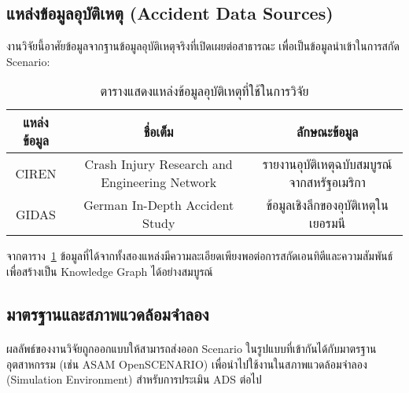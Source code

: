 \subsection{แหล่งข้อมูลอุบัติเหตุ (Accident Data Sources)}
งานวิจัยนี้อาศัยข้อมูลจากฐานข้อมูลอุบัติเหตุจริงที่เปิดเผยต่อสาธารณะ เพื่อเป็นข้อมูลนำเข้าในการสกัด Scenario:
\begin{table}[h!]
 \centering
 \caption{ตารางแสดงแหล่งข้อมูลอุบัติเหตุที่ใช้ในการวิจัย}
 \label{tab:data-sources}
 \begin{tabular}{|c|c|c|}
 \hline
 แหล่งข้อมูล & ชื่อเต็ม & ลักษณะข้อมูล \\
 \hline
 CIREN \cite{nhtsa_ciren} & Crash Injury Research and Engineering Network & รายงานอุบัติเหตุฉบับสมบูรณ์จากสหรัฐอเมริกา \\
\hline
GIDAS \cite{gidas_study} & German In-Depth Accident Study & ข้อมูลเชิงลึกของอุบัติเหตุในเยอรมนี \\
 \hline
 \end{tabular}
\end{table}

จากตาราง~\ref{tab:data-sources} ข้อมูลที่ได้จากทั้งสองแหล่งมีความละเอียดเพียงพอต่อการสกัดเอนทิตีและความสัมพันธ์เพื่อสร้างเป็น Knowledge Graph ได้อย่างสมบูรณ์

\subsection{มาตรฐานและสภาพแวดล้อมจำลอง}\label{subsec:ch2_standards}

\paragraph{}

ผลลัพธ์ของงานวิจัยถูกออกแบบให้สามารถส่งออก Scenario ในรูปแบบที่เข้ากันได้กับมาตรฐานอุตสาหกรรม (เช่น ASAM OpenSCENARIO) เพื่อนำไปใช้งานในสภาพแวดล้อมจำลอง (Simulation Environment) สำหรับการประเมิน ADS ต่อไป